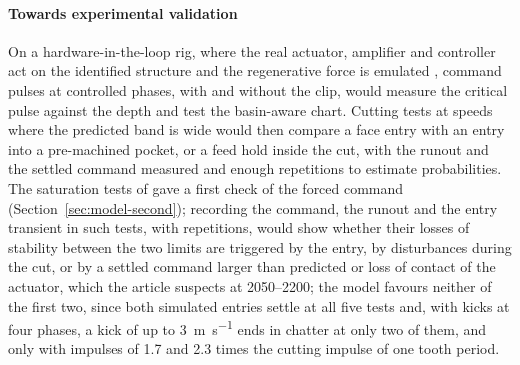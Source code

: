 \paragraph{Towards experimental validation}
On a hardware-in-the-loop rig, where the real actuator, amplifier and controller act on the identified structure and the regenerative force is emulated \citep{sahu2021bistability,sahu2023adaptive,mancisidor2019mechatronics}, command pulses at controlled phases, with and without the clip, would measure the critical pulse against the depth and test the basin-aware chart. Cutting tests at speeds where the predicted band is wide would then compare a face entry with an entry into a pre-machined pocket, or a feed hold inside the cut, with the runout and the settled command measured and enough repetitions to estimate probabilities. The saturation tests of \citet{ozsoy2025frequency} gave a first check of the forced command (Section~\ref{sec:model-second}); recording the command, the runout and the entry transient in such tests, with repetitions, would show whether their losses of stability between the two limits are triggered by the entry, by disturbances during the cut, or by a settled command larger than predicted or loss of contact of the actuator, which the article suspects at 2050--\SI{2200}{\rpm}; the model favours neither of the first two, since both simulated entries settle at all five tests and, with kicks at four phases, a kick of up to \SI{3}{\metre\per\second} ends in chatter at only two of them, and only with impulses of 1.7 and 2.3 times the cutting impulse of one tooth period.

